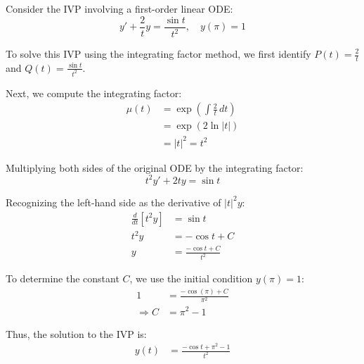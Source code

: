 \documentclass[11pt]{article}
\begin{document}
\begin{example}
    Consider the IVP involving a first-order linear ODE:
    $$
    y' + \frac{2}{t} y = \frac{\sin t}{t^2}, \quad y(\pi) = 1
    $$

    To solve this IVP using the integrating factor method, we first identify \( P(t) = \frac{2}{t} \) and \( Q(t) = \frac{\sin t}{t^2} \).

    Next, we compute the integrating factor:
    \begin{align*}
        \mu(t) &= \exp\left( \int \frac{2}{t} \, dt \right) \\
        &= \exp\left( 2 \ln |t| \right) \\
        &= |t|^2 = t^2
    \end{align*}

    Multiplying both sides of the original ODE by the integrating factor:
    $$
        t^2 y' + 2ty = \sin t
    $$

    Recognizing the left-hand side as the derivative of \( |t|^2 y \):
    \begin{align*}
        \frac{d}{dt}[t^2 y] &= \sin t \\
        t^2 y &= -\cos t + C \\
        y &= \frac{-\cos t + C}{t^2}
    \end{align*}

    To determine the constant \( C \), we use the initial condition \( y(\pi) = 1 \):
    \begin{align*}
        1 &= \frac{-\cos(\pi) + C}{\pi^2} \\
        \Rightarrow C &= \pi^2 - 1
    \end{align*}

    Thus, the solution to the IVP is:
    \begin{align*}
        y(t) &= \frac{-\cos t + \pi^2 - 1}{t^2}
    \end{align*}
\end{example}
\end{document}
